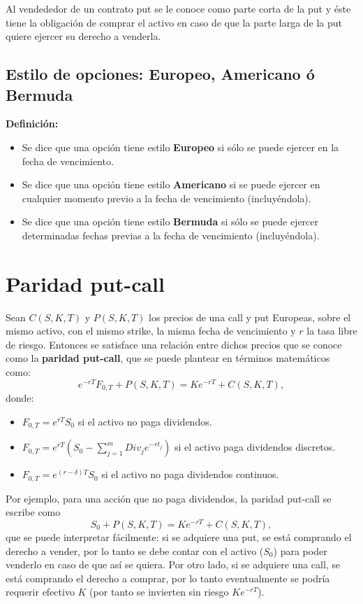 \documentclass[11pt]{article}
\begin{document}
Al vendededor de un contrato put se le conoce como parte corta de la put y éste tiene la obligación de comprar el activo en caso de que la parte larga de la put quiere ejercer su derecho a venderla.

\subsection{Estilo de opciones: Europeo, Americano ó Bermuda}

\textbf{Definición:}
\begin{itemize}

\item Se dice que una opción tiene estilo \textbf{Europeo} si sólo se puede ejercer en la fecha 
de vencimiento.
	
\item Se dice que una opción tiene estilo \textbf{Americano} si se puede ejercer en cualquier 
momento previo a la fecha de vencimiento (incluyéndola).
	
\item Se dice que una opción tiene estilo \textbf{Bermuda} si sólo se puede ejercer determinadas fechas previas a la fecha de vencimiento (incluyéndola).
\end{itemize}

\section{Paridad put-call}
	
Sean $C(S,K,T)$ y $P(S,K,T)$ los precios de una call y put Europeas, sobre el mismo activo, con el mismo strike, la misma fecha de vencimiento y $r$ la tasa libre de riesgo. Entonces se  satisface una relación entre dichos precios que se conoce como la \textbf{paridad  put-call}, que se puede plantear en términos matemáticos como:
$$e^{-rT}F_{0,T} + P(S,K,T) = Ke^{-rT} + C(S,K,T),$$ 
donde:

\begin{itemize}

\item $F_{0,T} = e^{rT}S_0$ si el activo no paga dividendos.
\item $F_{0,T} = e^{rT}\left(S_0 - \sum_{j=1}^m Div_j e^{-r t_j}\right)$ si el activo paga dividendos discretos.
\item $F_{0,T} = e^{(r-\delta)T}S_0$ si el activo no paga dividendos continuos.
\end{itemize}

Por ejemplo, para una acción que no paga dividendos, la paridad put-call se escribe como
$$S_0 + P(S,K,T) = Ke^{-rT} + C(S,K,T),$$
que se puede interpretar fácilmente: si se adquiere una put, se está comprando el derecho a vender, por lo tanto se debe contar con el activo ($S_0$) para 
poder venderlo en caso de que así se quiera. Por otro lado, si se adquiere una  call, se está comprando el derecho a comprar, por lo tanto eventualmente se 
podría requerir efectivo $K$ (por tanto se invierten sin riesgo $Ke^{-rT}$).
	
\end{document}
